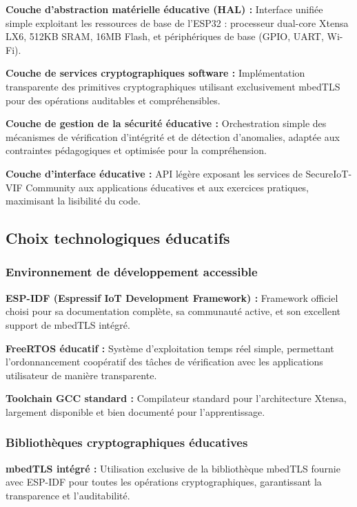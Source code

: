 \textbf{Couche d'abstraction matérielle éducative (HAL) :} Interface unifiée simple exploitant les ressources de base de l'ESP32 : processeur dual-core Xtensa LX6, 512KB SRAM, 16MB Flash, et périphériques de base (GPIO, UART, Wi-Fi).

\textbf{Couche de services cryptographiques software :} Implémentation transparente des primitives cryptographiques utilisant exclusivement mbedTLS pour des opérations auditables et compréhensibles.

\textbf{Couche de gestion de la sécurité éducative :} Orchestration simple des mécanismes de vérification d'intégrité et de détection d'anomalies, adaptée aux contraintes pédagogiques et optimisée pour la compréhension.

\textbf{Couche d'interface éducative :} API légère exposant les services de SecureIoT-VIF Community aux applications éducatives et aux exercices pratiques, maximisant la lisibilité du code.

\subsection{Choix technologiques éducatifs}

\subsubsection{Environnement de développement accessible}

\textbf{ESP-IDF (Espressif IoT Development Framework) :} Framework officiel choisi pour sa documentation complète, sa communauté active, et son excellent support de mbedTLS intégré.

\textbf{FreeRTOS éducatif :} Système d'exploitation temps réel simple, permettant l'ordonnancement coopératif des tâches de vérification avec les applications utilisateur de manière transparente.

\textbf{Toolchain GCC standard :} Compilateur standard pour l'architecture Xtensa, largement disponible et bien documenté pour l'apprentissage.

\subsubsection{Bibliothèques cryptographiques éducatives}

\textbf{mbedTLS intégré :} Utilisation exclusive de la bibliothèque mbedTLS fournie avec ESP-IDF pour toutes les opérations cryptographiques, garantissant la transparence et l'auditabilité.

